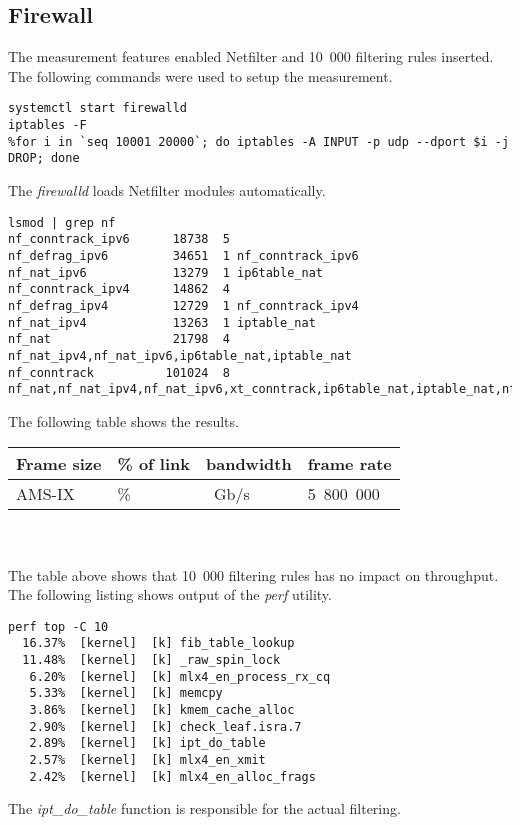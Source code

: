 
\subsection{Firewall}
The measurement features enabled Netfilter and 10~000 filtering rules inserted.
The following commands were used to setup the measurement.
\begin{lstlisting}
systemctl start firewalld
iptables -F
%for i in `seq 10001 20000`; do iptables -A INPUT -p udp --dport $i -j DROP; done
\end{lstlisting}
The {\it{firewalld}} loads Netfilter modules automatically.
\begin{lstlisting}
lsmod | grep nf
nf_conntrack_ipv6      18738  5 
nf_defrag_ipv6         34651  1 nf_conntrack_ipv6
nf_nat_ipv6            13279  1 ip6table_nat
nf_conntrack_ipv4      14862  4 
nf_defrag_ipv4         12729  1 nf_conntrack_ipv4
nf_nat_ipv4            13263  1 iptable_nat
nf_nat                 21798  4 nf_nat_ipv4,nf_nat_ipv6,ip6table_nat,iptable_nat
nf_conntrack          101024  8 nf_nat,nf_nat_ipv4,nf_nat_ipv6,xt_conntrack,ip6table_nat,iptable_nat,nf_conntrack_ipv4,nf_conntrack_ipv6
\end{lstlisting}
The following table shows the results.
\begin{tabular}{ | l | l | l | l | }
\hline
Frame size & \% of link & bandwidth & frame rate \\
\hline
AMS-IX & \% & ~Gb/s & 5~800~000 \\
\hline
\end{tabular}
\\
\\
The table above shows that 10~000 filtering rules has no impact on throughput.
The following listing shows output of the {\it{perf}} utility.
\begin{lstlisting}
perf top -C 10
  16.37%  [kernel]  [k] fib_table_lookup
  11.48%  [kernel]  [k] _raw_spin_lock
   6.20%  [kernel]  [k] mlx4_en_process_rx_cq
   5.33%  [kernel]  [k] memcpy
   3.86%  [kernel]  [k] kmem_cache_alloc
   2.90%  [kernel]  [k] check_leaf.isra.7
   2.89%  [kernel]  [k] ipt_do_table
   2.57%  [kernel]  [k] mlx4_en_xmit
   2.42%  [kernel]  [k] mlx4_en_alloc_frags
\end{lstlisting}
The {\it{ipt\_do\_table}} function is responsible for the actual filtering.
